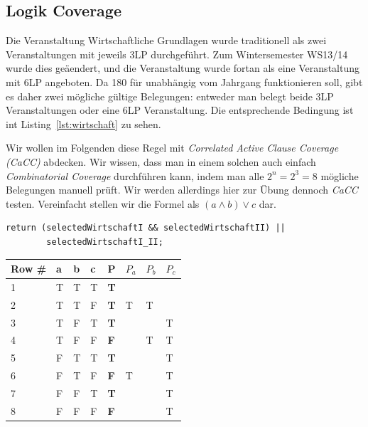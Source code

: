 \documentclass[ngerman]{article}
\begin{document}
\subsection{Logik Coverage}

Die Veranstaltung Wirtschaftliche Grundlagen wurde traditionell als zwei Veranstaltungen mit jeweils 3LP durchgeführt.
Zum Wintersemester WS13/14 wurde dies geäendert, und die Veranstaltung wurde fortan als eine Veranstaltung mit 6LP angeboten.
Da 180 für unabhängig vom Jahrgang funktionieren soll, gibt es daher zwei mögliche gültige Belegungen: entweder man belegt beide 3LP Veranstaltungen oder eine 6LP Veranstaltung.
Die entsprechende Bedingung ist int Listing~\ref{lst:wirtschaft} zu sehen.

Wir wollen im Folgenden diese Regel mit \emph{Correlated Active Clause Coverage (CaCC)} abdecken.
Wir wissen, dass man in einem solchen auch einfach \emph{Combinatorial Coverage} durchführen kann, indem man alle $2^n = 2^3 = 8$ mögliche Belegungen manuell prüft.
Wir werden allerdings hier zur Übung dennoch \emph{CaCC} testen.
Vereinfacht stellen wir die Formel als $(a \land b) \lor c$ dar.
\begin{lstlisting}[caption=Wirtschafts-Regel,label={lst:wirtschaft},frame=single]
return (selectedWirtschaftI && selectedWirtschaftII) ||
        selectedWirtschaftI_II;
\end{lstlisting}

\begin{table}
\begin{tabular}{|l|l|l|l|l|l|l|l|}
\hline
\textbf{Row \#} & \textbf{a} & \textbf{b} & \textbf{c} & \textbf{P} & \textbf{$P_a$} & \textbf{$P_b$} & \textbf{$P_c$} \\
\hline \hline
 1              & T          & T          & T          & \textbf{T} &                &                &                \\
 2              & T          & T          & F          & \textbf{T} & T              &   T            &                \\
 3              & T          & F          & T          & \textbf{T} &                &                & T              \\
 4              & T          & F          & F          & \textbf{F} &                &   T            & T              \\
 5              & F          & T          & T          & \textbf{T} &                &                & T              \\
 6              & F          & T          & F          & \textbf{F} & T              &                & T              \\
 7              & F          & F          & T          & \textbf{T} &                &                & T              \\
 8              & F          & F          & F          & \textbf{F} &                &                & T              \\
\end{tabular}
\end{table}
\end{document}
